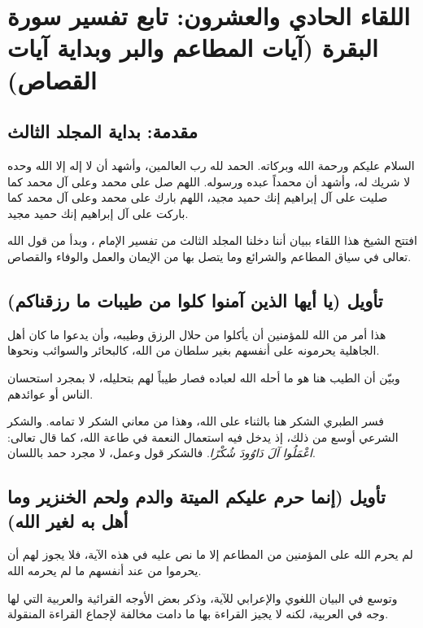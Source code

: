 \chapter{اللقاء الحادي والعشرون: تابع تفسير سورة البقرة (آيات المطاعم والبر وبداية آيات القصاص)}

\section{مقدمة: بداية المجلد الثالث}
السلام عليكم ورحمة الله وبركاته. الحمد لله رب العالمين، وأشهد أن لا إله إلا الله وحده لا شريك له، وأشهد أن محمداً عبده ورسوله. اللهم صل على محمد وعلى آل محمد كما صليت على آل إبراهيم إنك حميد مجيد، اللهم بارك على محمد وعلى آل محمد كما باركت على آل إبراهيم إنك حميد مجيد.

افتتح الشيخ هذا اللقاء ببيان أننا دخلنا المجلد الثالث من تفسير الإمام ، وبدأ من قول الله تعالى في سياق المطاعم والشرائع وما يتصل بها من الإيمان والعمل والوفاء والقصاص.

\separator

\section{تأويل (يا أيها الذين آمنوا كلوا من طيبات ما رزقناكم)}
 هذا أمر من الله للمؤمنين أن يأكلوا من حلال الرزق وطيبه، وأن يدعوا ما كان أهل الجاهلية يحرمونه على أنفسهم بغير سلطان من الله، كالبحائر والسوائب ونحوها.

وبيّن  أن الطيب هنا هو ما أحله الله لعباده فصار طيباً لهم بتحليله، لا بمجرد استحسان الناس أو عوائدهم.

\begin{fawaid}
فسر الطبري الشكر هنا بالثناء على الله، وهذا من معاني الشكر لا تمامه. والشكر الشرعي أوسع من ذلك، إذ يدخل فيه استعمال النعمة في طاعة الله، كما قال تعالى: \textit{اعْمَلُوا آلَ دَاوُودَ شُكْرًا}. فالشكر قول وعمل، لا مجرد حمد باللسان.
\end{fawaid}

\separator

\section{تأويل (إنما حرم عليكم الميتة والدم ولحم الخنزير وما أهل به لغير الله)}
 لم يحرم الله على المؤمنين من المطاعم إلا ما نص عليه في هذه الآية، فلا يجوز لهم أن يحرموا من عند أنفسهم ما لم يحرمه الله.

وتوسع  في البيان اللغوي والإعرابي للآية، وذكر بعض الأوجه القرائية والعربية التي لها وجه في العربية، لكنه لا يجيز القراءة بها ما دامت مخالفة لإجماع القراءة المنقولة.

